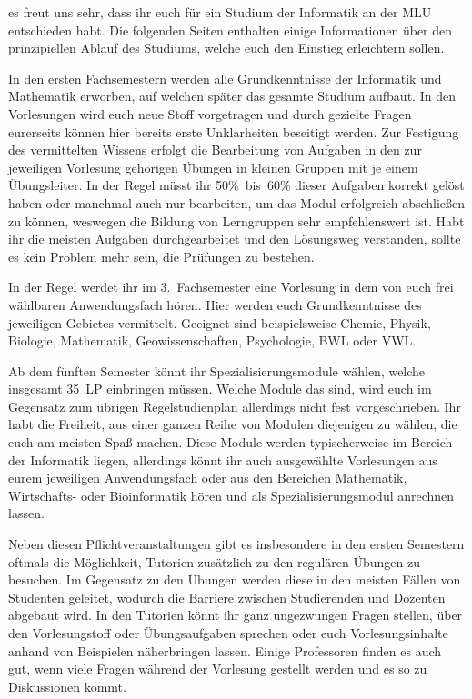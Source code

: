 es freut uns sehr, dass ihr euch für ein Studium der Informatik an der MLU entschieden habt. Die folgenden Seiten enthalten einige Informationen über den prinzipiellen Ablauf des Studiums, welche euch den Einstieg erleichtern sollen.\par

In den ersten Fachsemestern werden alle Grundkenntnisse der Informatik und Mathematik erworben, auf welchen später das gesamte Studium aufbaut.
In den Vorlesungen wird euch neue Stoff vorgetragen und durch gezielte Fragen eurerseits können hier bereits erste Unklarheiten beseitigt werden.
Zur Festigung des vermittelten Wissens erfolgt die Bearbeitung von Aufgaben in den zur jeweiligen Vorlesung gehörigen Übungen in kleinen Gruppen mit je einem Übungsleiter.
In der Regel müsst ihr 50\%~bis~60\% dieser Aufgaben korrekt gelöst haben oder manchmal auch nur bearbeiten, um das Modul erfolgreich abschließen zu können, weswegen die Bildung von Lerngruppen sehr empfehlenswert ist.
Habt ihr die meisten Aufgaben durchgearbeitet und den Lösungsweg verstanden, sollte es kein Problem mehr sein, die Prüfungen zu bestehen.

In der Regel werdet ihr im 3.~Fachsemester eine Vorlesung in dem von euch frei wählbaren Anwendungsfach hören.
Hier werden euch Grundkenntnisse des jeweiligen Gebietes vermittelt.
Geeignet sind beispielsweise Chemie, Physik, Biologie, Mathematik, Geowissenschaften, Psychologie, BWL oder VWL.

Ab dem fünften Semester könnt ihr Spezialisierungsmodule wählen, welche insgesamt 35~LP einbringen müssen.
Welche Module das sind, wird euch im Gegensatz zum übrigen Regelstudienplan allerdings nicht fest vorgeschrieben.
Ihr habt die Freiheit, aus einer ganzen Reihe von Modulen diejenigen zu wählen, die euch am meisten Spaß machen.
Diese Module werden typischerweise im Bereich der Informatik liegen, allerdings könnt ihr auch ausgewählte Vorlesungen aus eurem jeweiligen Anwendungsfach oder aus den Bereichen Mathematik, Wirtschafts- oder Bioinformatik hören und als Spezialisierungsmodul anrechnen lassen.

Neben diesen Pflichtveranstaltungen gibt es insbesondere in den ersten Semestern oftmals die Möglichkeit, Tutorien zusätzlich zu den regulären Übungen zu besuchen.
Im Gegensatz zu den Übungen werden diese in den meisten Fällen von Studenten geleitet, wodurch die Barriere zwischen Studierenden und Dozenten abgebaut wird.
In den Tutorien könnt ihr ganz ungezwungen Fragen stellen, über den Vorlesungstoff oder Übungsaufgaben sprechen oder euch Vorlesungsinhalte anhand von Beispielen näherbringen lassen. Einige Professoren finden es auch gut, wenn viele Fragen während der Vorlesung gestellt werden und es so zu Diskussionen kommt.

